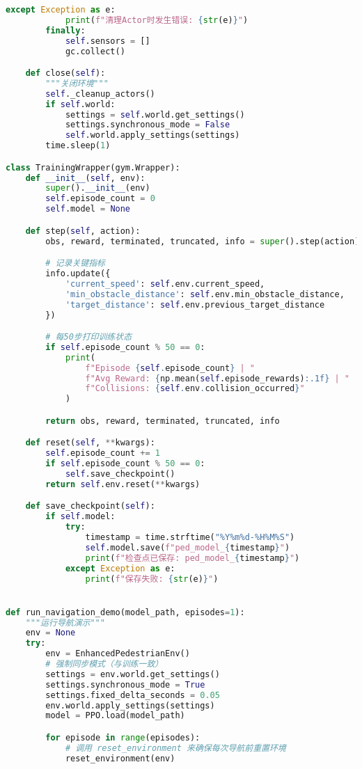 \begin{lstlisting}[language=Python]
        except Exception as e:
            print(f"清理Actor时发生错误: {str(e)}")
        finally:
            self.sensors = []
            gc.collect()

    def close(self):
        """关闭环境"""
        self._cleanup_actors()
        if self.world:
            settings = self.world.get_settings()
            settings.synchronous_mode = False
            self.world.apply_settings(settings)
        time.sleep(1)

class TrainingWrapper(gym.Wrapper):
    def __init__(self, env):
        super().__init__(env)
        self.episode_count = 0
        self.model = None

    def step(self, action):
        obs, reward, terminated, truncated, info = super().step(action)

        # 记录关键指标
        info.update({
            'current_speed': self.env.current_speed,
            'min_obstacle_distance': self.env.min_obstacle_distance,
            'target_distance': self.env.previous_target_distance
        })

        # 每50步打印训练状态
        if self.episode_count % 50 == 0:
            print(
                f"Episode {self.episode_count} | "
                f"Avg Reward: {np.mean(self.episode_rewards):.1f} | "
                f"Collisions: {self.env.collision_occurred}"
            )

        return obs, reward, terminated, truncated, info

    def reset(self, **kwargs):
        self.episode_count += 1
        if self.episode_count % 50 == 0:
            self.save_checkpoint()
        return self.env.reset(**kwargs)

    def save_checkpoint(self):
        if self.model:
            try:
                timestamp = time.strftime("%Y%m%d-%H%M%S")
                self.model.save(f"ped_model_{timestamp}")
                print(f"检查点已保存: ped_model_{timestamp}")
            except Exception as e:
                print(f"保存失败: {str(e)}")


def run_navigation_demo(model_path, episodes=1):
    """运行导航演示"""
    env = None
    try:
        env = EnhancedPedestrianEnv()
        # 强制同步模式（与训练一致）
        settings = env.world.get_settings()
        settings.synchronous_mode = True
        settings.fixed_delta_seconds = 0.05
        env.world.apply_settings(settings)
        model = PPO.load(model_path)

        for episode in range(episodes):
            # 调用 reset_environment 来确保每次导航前重置环境
            reset_environment(env)


\end{lstlisting}

